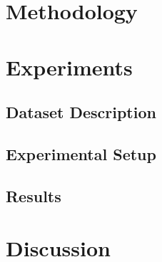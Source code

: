 \documentclass{article}
\begin{document}
    


\section{Methodology}


\section{Experiments}


\subsection{Dataset Description}


\subsection{Experimental Setup}


\subsection{Results}


\section{Discussion}

\end{document}
